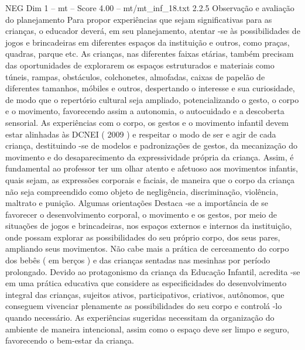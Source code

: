 \begin{textsample}{NEG Dim 1 – mt – Score 4.00 – mt/mt\_inf\_18.txt}  \label{ex:f1_neg_217}
2.2.5 Observação e avaliação do planejamento Para propor experiências que sejam significativas para as crianças, o educador deverá, em seu planejamento, atentar -se às possibilidades de jogos e brincadeiras em diferentes espaços da instituição e outros, como praças, quadras, parque etc.
As crianças, nas diferentes faixas etárias, também precisam das oportunidades de explorarem os espaços estruturados e materiais como túneis, rampas, obstáculos, colchonetes, almofadas, caixas de papelão de diferentes tamanhos, móbiles e outros, despertando o interesse e sua curiosidade, de modo que o repertório cultural seja ampliado, potencializando o gesto, o corpo e o movimento, favorecendo assim a autonomia, o autocuidado e a descoberta sensorial.
As experiências com o corpo, os gestos e o movimento infantil devem estar alinhadas às DCNEI ( 2009 ) e respeitar o modo de ser e agir de cada criança, destituindo -se de modelos e padronizações de gestos, da mecanização do movimento e do desaparecimento da expressividade própria da criança.
Assim, é fundamental ao professor ter um olhar atento e afetuoso aos movimentos infantis, quais sejam, as expressões corporais e faciais, de maneira que o corpo da criança não seja compreendido como objeto de negligência, discriminação, violência, maltrato e punição.
Algumas orientações Destaca -se a importância de se favorecer o desenvolvimento corporal, o movimento e os gestos, por meio de situações de jogos e brincadeiras, nos espaços externos e internos da instituição, onde possam explorar as possibilidades do seu próprio corpo, dos seus pares, ampliando seus movimentos.
Não cabe mais a prática de cerceamento do corpo dos bebês ( em berços ) e das crianças sentadas nas mesinhas por período prolongado.
Devido ao protagonismo da criança da Educação Infantil, acredita -se em uma prática educativa que considere as especificidades do desenvolvimento integral das crianças, sujeitos ativos, participativos, criativos, autônomos, que conseguem vivenciar plenamente as possibilidades do seu corpo e controlá -lo quando necessário.
As experiências sugeridas necessitam da organização do ambiente de maneira intencional, assim como o espaço deve ser limpo e seguro, favorecendo o bem-estar da criança.

\end{textsample}
